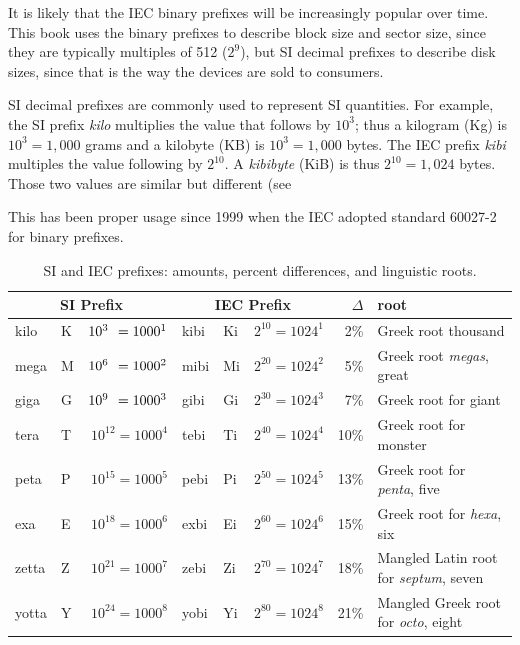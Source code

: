 It is likely that the IEC binary prefixes will be increasingly popular
over time. This book uses the binary prefixes to describe block size
and sector size, since they are typically multiples of 512 ($2^9$),
but SI decimal prefixes to describe disk sizes, since that is the way
the devices are sold to consumers.

SI decimal prefixes are commonly used to represent SI
quantities. For example, the SI prefix \emph{kilo} multiplies the value that follows by
$10^3$; thus a kilogram (Kg) is
$10^3=1,000$ grams and a kilobyte (KB) is
$10^3=1,000$ bytes. The IEC prefix \emph{kibi} multiples the value following by $2^{10}$. A \emph{kibibyte}
(KiB) is thus $2^{10}=1,024$ bytes. Those two values are similar but
different (see 

This has been proper usage
since 1999 when the IEC adopted standard 60027-2 for binary prefixes.



\newcommand{\WZ}{{\color{white}0}}

\begin{table}
\begin{tabular}{||llr|llr|rl|}
\multicolumn{3}{c}{SI Prefix} & \multicolumn{3}{c}{IEC Prefix} & $\Delta$ & root \\ 
\hline
kilo  & K & $10^{3\WZ} = 1000^1 $ & kibi & Ki & $2^{10} = 1024^1 $& 2\% & Greek root {thousand} \\
\hline
mega  & M & $10^{6\WZ} = 1000^2 $ & mibi & Mi & $2^{20} = 1024^2 $& 5\% & Greek root \emph{megas}, {great}\\
\hline
giga  & G & $10^{9\WZ} = 1000^3 $ & gibi & Gi & $2^{30} = 1024^3 $& 7\% & Greek root for {giant}\\
\hline
tera  & T & $10^{12} = 1000^4$ & tebi & Ti & $2^{40} = 1024^4 $& 10\% & Greek root for {monster}\\
\hline
peta  & P & $10^{15} = 1000^5$ & pebi & Pi & $2^{50} = 1024^5 $& 13\% & Greek root for \emph{penta}, {five}\\
\hline
exa   & E & $10^{18} = 1000^6$ & exbi & Ei & $2^{60} = 1024^6 $& 15\% & Greek root for \emph{hexa}, {six}\\
\hline
zetta & Z & $10^{21} = 1000^7$ & zebi & Zi & $2^{70} = 1024^7 $& 18\% & Mangled Latin root for \emph{septum}, {seven}\\
\hline
yotta & Y & $10^{24} = 1000^8$ & yobi & Yi & $2^{80} = 1024^8 $& 21\% & Mangled Greek root for \emph{octo}, {eight}\\
\hline
\hline
\end{tabular}
\caption{SI and IEC prefixes: amounts, percent differences, and
  linguistic roots.}\label{si-iec-differences}
\end{table}


